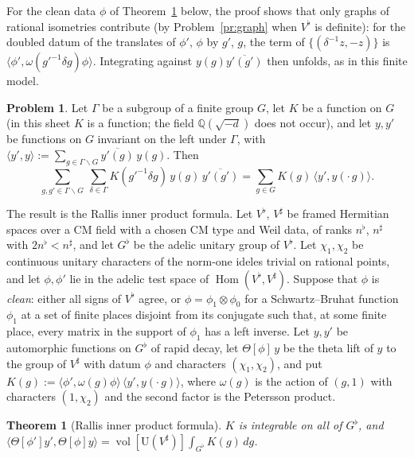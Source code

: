 \documentclass[reqno]{amsart}
\theoremstyle{definition}
\newtheorem{problem}{Problem}[section]
\theoremstyle{plain}
\newtheorem{theorem}{Theorem}[section]
\newcommand{\U}{\mathrm{U}}
\newcommand{\Hom}{\operatorname{Hom}}
\newcommand{\vol}{\operatorname{vol}}
\begin{document}
For the clean data \(\phi\) of Theorem~\ref{thm:rallis} below, the proof shows that only graphs of rational isometries contribute (by Problem~\ref{pr:graph} when \(V^\flat\) is definite): for the doubled datum of the translates of \(\phi'\), \(\phi\) by \(g'\), \(g\), the term of \(\{(\delta^{-1} z, -z)\}\) is \(\langle \phi', \omega(g'^{-1}\delta g)\phi\rangle\).  Integrating against \(y(g)\overline{y'(g')}\) then unfolds, as in this finite model.

\begin{problem}\label{pr:unfold}
Let \(\Gamma\) be a subgroup of a finite group \(G\), let \(K\) be a function on \(G\) (in this sheet \(K\) is a function; the field \(\mathbb{Q}(\sqrt{-d})\) does not occur), and let \(y, y'\) be functions on \(G\) invariant on the left under \(\Gamma\), with \(\langle y', y\rangle := \sum_{g \in \Gamma\backslash G} \overline{y'(g)}\, y(g)\).  Then
\[
  \sum_{g, g' \in \Gamma\backslash G}\ \sum_{\delta \in \Gamma} K(g'^{-1}\delta g)\, y(g)\, \overline{y'(g')} = \sum_{g \in G} K(g)\, \bigl\langle y', y(\cdot\, g)\bigr\rangle .
\]
\end{problem}

The result is the Rallis inner product formula.  Let \(V^\flat\), \(V^\sharp\) be framed Hermitian spaces over a CM field with a chosen CM type and Weil data, of ranks \(n^\flat\), \(n^\sharp\) with \(2n^\flat < n^\sharp\), and let \(G^\flat\) be the adelic unitary group of \(V^\flat\).  Let \(\chi_1, \chi_2\) be continuous unitary characters of the norm-one ideles trivial on rational points, and let \(\phi, \phi'\) lie in the adelic test space of \(\Hom(V^\flat, V^\sharp)\).  Suppose that \(\phi\) is \emph{clean}: either all signs of \(V^\flat\) agree, or \(\phi = \phi_1 \otimes \phi_0\) for a Schwartz--Bruhat function \(\phi_1\) at a set of finite places disjoint from its conjugate such that, at some finite place, every matrix in the support of \(\phi_1\) has a left inverse.  Let \(y, y'\) be automorphic functions on \(G^\flat\) of rapid decay, let \(\Theta[\phi]\, y\) be the theta lift of \(y\) to the group of \(V^\sharp\) with datum \(\phi\) and characters \((\chi_1, \chi_2)\), and put \(K(g) := \langle \phi', \omega(g) \phi\rangle\, \langle y', y(\cdot\, g)\rangle\), where \(\omega(g)\) is the action of \((g, 1)\) with characters \((1, \chi_2)\) and the second factor is the Petersson product.

\begin{theorem}[Rallis inner product formula]\label{thm:rallis}
\(K\) is integrable on all of \(G^\flat\), and \(\langle \Theta[\phi'] y', \Theta[\phi] y\rangle = \vol[\U(V^\sharp)] \int_{G^\flat} K(g)\, dg\).
\end{theorem}
\end{document}
